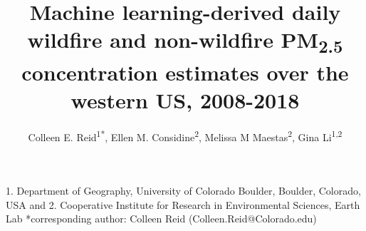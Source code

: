 \documentclass[english]{article}
\begin{document}

\title{Machine learning-derived daily wildfire and non-wildfire PM\textsubscript{2.5} concentration estimates over the western US, 2008-2018}

\author{Colleen E. Reid\textsuperscript{1{*}},
Ellen M. Considine\textsuperscript{2},
Melissa M Maestas\textsuperscript{2}, 
Gina Li\textsuperscript{1,2}}

\maketitle
\thispagestyle{fancy}

1. Department of Geography, University of Colorado Boulder,
Boulder, Colorado, USA and
2. Cooperative Institute for Research in
Environmental Sciences, Earth Lab %
{*}corresponding author: Colleen Reid (Colleen.Reid@Colorado.edu)
\end{document}
